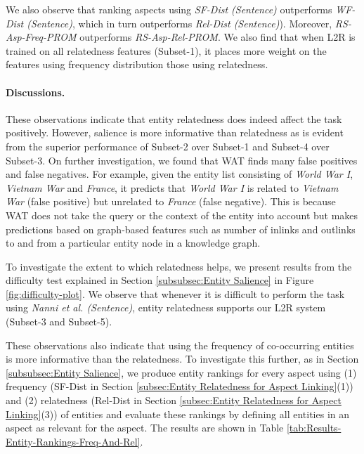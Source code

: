 We also observe that ranking aspects using \textit{SF-Dist (Sentence)} outperforms \textit{WF-Dist (Sentence)}, which in turn outperforms \textit{Rel-Dist (Sentence)}). Moreover, \textit{RS-Asp-Freq-PROM} outperforms \textit{RS-Asp-Rel-PROM}. We also find that when L2R is trained on all relatedness features (Subset-1), it places more weight on the features using frequency distribution those using relatedness. 

\paragraph{\textbf{Discussions.}}
These observations indicate that entity relatedness does indeed affect the task positively. However, salience is more informative than relatedness as is evident from the superior performance of Subset-2 over Subset-1 and Subset-4 over Subset-3. On further investigation, we found that WAT finds many false positives and false negatives. For example, given the entity list consisting of  \textit{World War I}, \textit{Vietnam War} and \textit{France}, it predicts that \textit{World War I} is related to \textit{Vietnam War} (false positive) but  unrelated to \textit{France} (false negative). This is because WAT does not take
the query or the context of the entity into account but makes predictions based on  graph-based features such as number of inlinks and outlinks to and from a particular entity node in a knowledge graph. 

To investigate the extent to which relatedness helps, we present results from the difficulty test explained in Section \ref{subsubsec:Entity Salience} in Figure \ref{fig:difficulty-plot}. We observe that whenever it is difficult to perform the task using \textit{Nanni et al. (Sentence)}, entity relatedness supports our L2R system (Subset-3 and Subset-5).

 These observations also indicate that using the frequency of co-occurring entities is more informative than the relatedness. To investigate this further, as in Section \ref{subsubsec:Entity Salience}, we produce entity rankings for every aspect using (1) frequency (SF-Dist in Section \ref{subsec:Entity Relatedness for Aspect Linking}(1)) and (2) relatedness (Rel-Dist in Section \ref{subsec:Entity Relatedness for Aspect Linking}(3)) of entities and evaluate these rankings by defining all entities in an aspect as relevant for the aspect. The results are shown in Table \ref{tab:Results-Entity-Rankings-Freq-And-Rel}.


